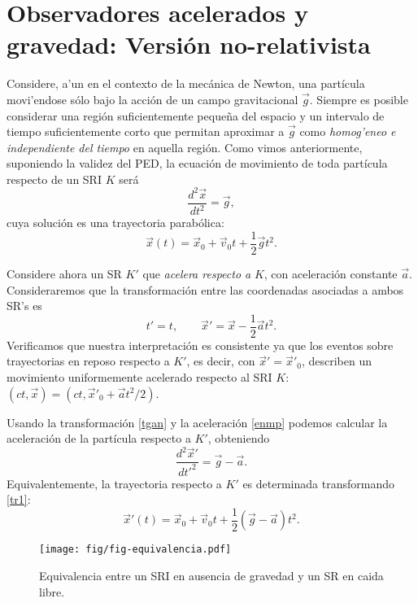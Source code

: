 \section{Observadores acelerados y gravedad: Versión no-rela\-ti\-vis\-ta}
Considere, a'un en el contexto de la mecánica de Newton, una partícula movi'endose sólo bajo la acción de un campo gravitacional $\vec{g}$. Siempre es posible considerar una región suficientemente peque\~na del espacio y un intervalo de tiempo suficientemente corto que permitan aproximar a $\vec{g}$ como \textit{homog'eneo e independiente del tiempo} en aquella región. Como vimos anteriormente, suponiendo la validez del PED, la ecuación de movimiento de toda partícula respecto de un SRI $K$ será
\begin{equation}\label{enmp}
\frac{d^2\vec{x}}{dt^2}=\vec{g},
\end{equation}
cuya solución es una trayectoria parabólica:
\begin{equation}\label{tr1}
\vec{x}(t)=\vec{x}_0+\vec{v}_0t+\frac{1}2\vec{g}t^2.
\end{equation}

Considere ahora un SR $K'$ que \textit{acelera respecto a} $K$, con aceleración constante $\vec{a}$. Consideraremos que la transformación entre las coordenadas asociadas a ambos SR's es 
\begin{equation}\label{tgan}
t'=t, \qquad \vec{x}'=\vec{x}-\frac{1}2\vec{a}t^2.
\end{equation}
Verificamos que nuestra interpretación es consistente ya que los eventos sobre trayectorias en reposo respecto a $K'$, es decir, con $\vec{x}'=\vec{x}'_0$, describen un movimiento uniformemente acelerado respecto al SRI $K$: $(ct,\vec{x})=(ct,\vec{x}'_0+\vec{a}t^2/2)$.

Usando la transformación \eqref{tgan} y la aceleración \eqref{enmp} podemos calcular la aceleración de la partícula respecto a $K'$, obteniendo
\begin{equation}\label{acelprima}
\frac{d^2\vec{x}'}{dt'^2}=\vec{g}-\vec{a}.
\end{equation}
Equivalentemente, la trayectoria respecto a $K'$ es determinada transformando  \eqref{tr1}:
\begin{equation}
\vec{x}'(t)=\vec{x}_0+\vec{v}_0t+\frac{1}2(\vec{g}-\vec{a})t^2.
\end{equation}
\begin{center}
\begin{figure}[H]
\centerline{\texttt{[image: fig/fig-equivalencia.pdf]}}
\caption{Equivalencia entre un SRI en ausencia de gravedad y un SR en caida libre.}
\label{fig:equiv2}
\end{figure}
\end{center}

